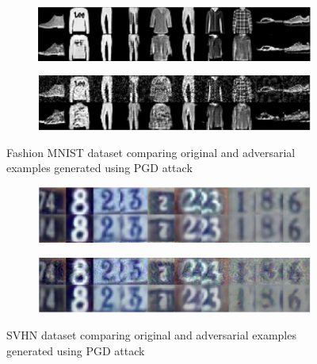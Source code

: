 \documentclass[journal]{IEEEtran}
\begin{document}
\begin{figure}[t]
	\centering

	\begin{subfigure}{\textwidth}
		\centering
		\includegraphics[width=\textwidth]{Images/MNIST/PGD/Original.png}
	\end{subfigure}
	\begin{subfigure}{\textwidth}
		\centering
		\includegraphics[width=\textwidth]{Images/MNIST/PGD/PGD.png}
	\end{subfigure}

	\caption{Fashion MNIST dataset comparing original and adversarial examples generated using PGD\cite{PGD} attack}

	\label{fig: FMNIST_PGD}
\end{figure}

\begin{figure}[t]
	\centering

	\begin{subfigure}{\textwidth}
		\centering
		\includegraphics[width=\textwidth]{Images/SVHN/Original.png}
	\end{subfigure}
	\begin{subfigure}{\textwidth}
		\centering
		\includegraphics[width=\textwidth]{Images/SVHN/PGD.png}
	\end{subfigure}

	\caption{SVHN dataset comparing original and adversarial examples generated using PGD\cite{PGD} attack}
	
	\label{fig: SVHN_PGD}
\end{figure}
\end{document}

